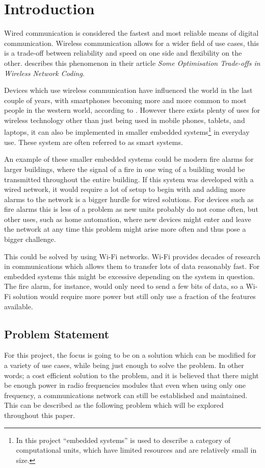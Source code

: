 \chapter{Introduction}
\vspace{-20pt}
Wired communication is considered the fastest and most reliable means of digital communication.
Wireless communication allows for a wider field of use cases, this is a trade-off between reliability and speed on one side and flexibility on the other. 
\citet{wirelessTradeoffs} describes this phenomenon in their article \emph{Some Optimisation Trade-offs in Wireless Network Coding}.

Devices which use wireless communication have influenced the world in the last couple of years, with smartphones becoming more and more common to most people in the western world, according to \citet{2013-SmartPhoneUse}.
However there exists plenty of uses for wireless technology other than just being used in mobile phones, tablets, and laptops, it can also be implemented in smaller embedded systems\footnote{In this project ``embedded systems'' is used to describe a category of computational units, which have limited resources and are relatively small in size. } in everyday use.
These system are often referred to as smart systems.

An example of these smaller embedded systems could be modern fire alarms for larger buildings, where the signal of a fire in one wing of a building would be transmitted throughout the entire building.
If this system was developed with a wired network, it would require a lot of setup to begin with 
and adding more alarms to the network is a bigger hurdle for wired solutions. 
For devices such as fire alarms this is less of a problem as new units probably do not come often, but other uses, such as home automation, where new devices might enter and leave the network at any time this problem might arise more often and thus pose a bigger challenge.

This could be solved by using Wi-Fi networks.
Wi-Fi provides decades of research in communications which allows them to transfer lots of data reasonably fast.
For embedded systems this might be excessive depending on the system in question.
The fire alarm, for instance, would only need to send a few bits of data, so a Wi-Fi solution would require more power but still only use a fraction of the features available.

\newpage
\section{Problem Statement}\label{sec:problemStatement}
For this project, the focus is going to be on a solution which can be modified for a variety of use cases, while being just enough to solve the problem.
In other words; a cost efficient solution to the problem, and it is believed that there might be enough power in radio frequencies modules that even when using only one frequency, a communications network can still be established and maintained.
This can be described as the following problem which will be explored throughout this paper.

